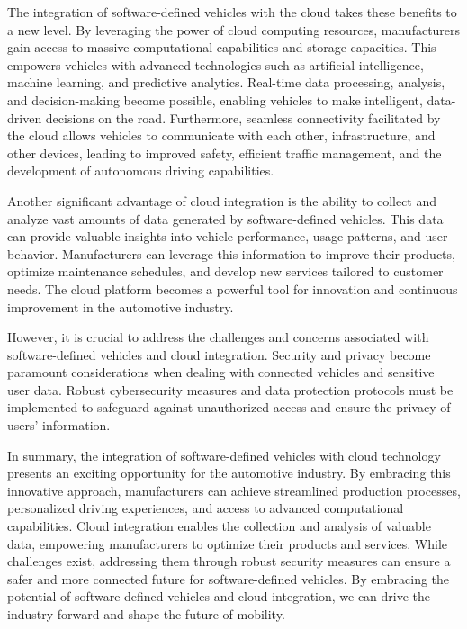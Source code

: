 \documentclass[
12pt,
oneside, 
onehalfspacing, 
nolistspacing, 
parskip, 
chapterinoneline, 
]{AASTCOMPUTER}
\begin{document}
The integration of software-defined vehicles with the cloud takes these benefits to a new level. By leveraging the power of cloud computing resources, manufacturers gain access to massive computational capabilities and storage capacities. This empowers vehicles with advanced technologies such as artificial intelligence, machine learning, and predictive analytics. Real-time data processing, analysis, and decision-making become possible, enabling vehicles to make intelligent, data-driven decisions on the road. Furthermore, seamless connectivity facilitated by the cloud allows vehicles to communicate with each other, infrastructure, and other devices, leading to improved safety, efficient traffic management, and the development of autonomous driving capabilities.

Another significant advantage of cloud integration is the ability to collect and analyze vast amounts of data generated by software-defined vehicles. This data can provide valuable insights into vehicle performance, usage patterns, and user behavior. Manufacturers can leverage this information to improve their products, optimize maintenance schedules, and develop new services tailored to customer needs. The cloud platform becomes a powerful tool for innovation and continuous improvement in the automotive industry.

However, it is crucial to address the challenges and concerns associated with software-defined vehicles and cloud integration. Security and privacy become paramount considerations when dealing with connected vehicles and sensitive user data. Robust cybersecurity measures and data protection protocols must be implemented to safeguard against unauthorized access and ensure the privacy of users' information.

In summary, the integration of software-defined vehicles with cloud technology presents an exciting opportunity for the automotive industry. By embracing this innovative approach, manufacturers can achieve streamlined production processes, personalized driving experiences, and access to advanced computational capabilities. Cloud integration enables the collection and analysis of valuable data, empowering manufacturers to optimize their products and services. While challenges exist, addressing them through robust security measures can ensure a safer and more connected future for software-defined vehicles. By embracing the potential of software-defined vehicles and cloud integration, we can drive the industry forward and shape the future of mobility.
\end{document}
